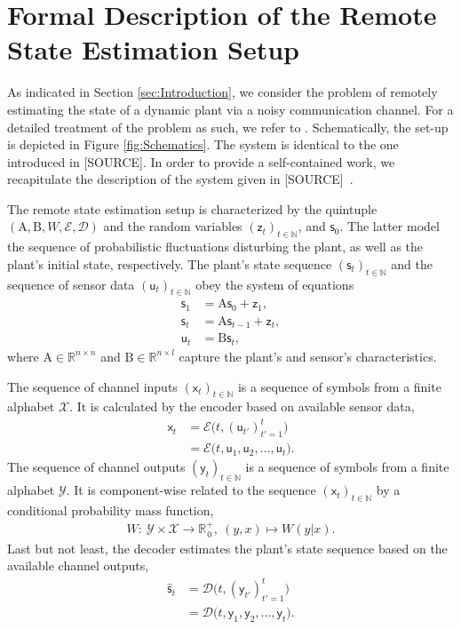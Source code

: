 \documentclass[conference]{IEEEtran}
\newcommand{\rx}{\mathsf{x}}
\newcommand{\ry}{\mathsf{y}}
\newcommand{\rs}{\mathsf{s}}
\newcommand{\rz}{\mathsf{z}}
\newcommand{\ru}{\mathsf{u}}
\def\E{{\mathcal E}}
\def\D{{\mathcal D}}
\def\X{{\mathcal X}}
\def\Y{{\mathcal Y}}
\def\NN{{\mathbb N}}
\def\RR{{\mathbb R}}
\def\mA{\bm{\mathrm{A}}}
\def\mB{\bm{\mathrm{B}}}
\newcommand{\sdummy}{{\color{red}[SOURCE]}}
\begin{document}
\section{Formal Description of the Remote State Estimation Setup}	\label{sec:FormalEstimationSetup}
	\noindent As indicated in Section \ref{sec:Introduction}, we consider the problem of remotely estimating the state of a dynamic plant via a noisy communication channel. 
	For a detailed treatment of the problem as such, we refer to \cite{MS07}. Schematically, the set-up is depicted in Figure \ref{fig:Schematics}. 
	The system is identical to the one introduced in \sdummy. In order to provide a self-contained work, we recapitulate the description of the system given in \sdummy~.

	The remote state estimation setup is characterized by the quintuple \((\mA,\mB,W,\E,\D)\) and the random variables \((\rz_t)_{t\in\NN}\), and \(\rs_{0}\). 
	The latter model the sequence of probabilistic fluctuations disturbing the plant, as well as the plant's initial state, respectively. The plant's state sequence \((\rs_t)_{t\in\NN}\) 
	and the sequence of sensor data \((\ru_t)_{t\in\NN}\) obey the system of equations
	\begin{align*}	\rs_1    &= \mA \rs_0 + \rz_1, \\ 
					\rs_t    &= \mA \rs_{t-1} + \rz_t,\\ 
					\ru_t    &= \mB \rs_t,
	\end{align*}
	where \(\mA\in\RR^{n\times n}\) and \(\mB\in\RR^{n\times l}\) capture the plant's and sensor's characteristics. 

	The sequence of channel inputs \((\rx_t)_{t\in\NN}\) is a sequence
	of symbols from a finite alphabet \(\X\). It is calculated by the encoder based on available sensor data,
	\begin{align*}	\rx_t   &= \E \big(t, (\ru_{t'})_{t'=1}^{t}\big) \\
							&= \E\big(t, \ru_1,\ru_2,\ldots,\ru_t\big).
	\end{align*} 
	The sequence of channel outputs \((\ry_t)_{t\in\NN}\) is a sequence
	of symbols from a finite alphabet \(\Y\). It is component-wise related to the sequence \((\rx_t)_{t\in\NN}\) by a conditional probability mass function,
	\begin{align*}	W :~ \Y \times \X \rightarrow \RR_{\hspace{1pt}0}^+,~(y,x) \mapsto W(y|x).
	\end{align*}
	Last but not least, the decoder estimates the plant's state sequence based on the available channel outputs,
	\begin{align*}	\hat{\rs}_t  	&= \D \big(t, (\ry_{t'})_{t'=1}^{t}\big) \\ 
									&= \D\big(t,\ry_1,\ry_2,\ldots,\ry_t\big).
	\end{align*}
\end{document}

